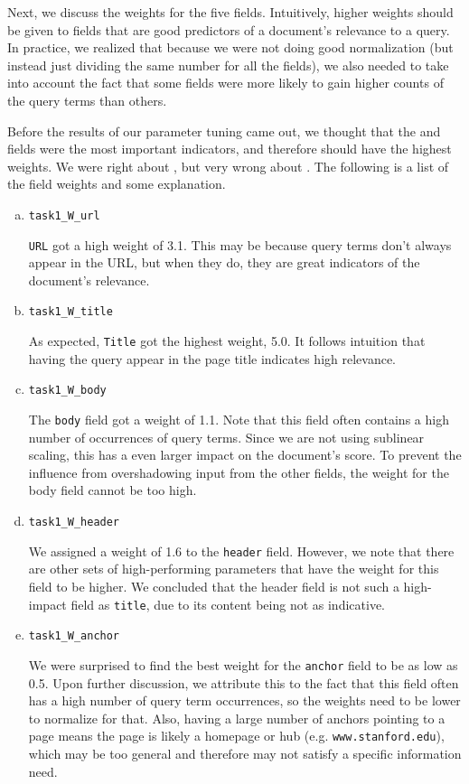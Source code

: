 \documentclass[10pt,twocolumn]{article}
\begin{document}
Next, we discuss the weights for the five fields. Intuitively, higher weights should be given to fields that are good predictors of a document's relevance to a query. In practice, we realized that because we were not doing good normalization (but instead just dividing the same number for all the fields), we also needed to take into account the fact that some fields were more likely to gain higher counts of the query terms than others.

Before the results of our parameter tuning came out, we thought that the  and  fields were the most important indicators, and therefore should have the highest weights. We were right about , but very wrong about . The following is a list of the field weights and some explanation.
\begin{enumerate}[(a)]
\item \texttt{task1\_W\_url}

\texttt{URL} got a high weight of 3.1. This may be because query terms don't always appear in the URL, but when they do, they are great indicators of the document's relevance.
\item \texttt{task1\_W\_title}

As expected, \texttt{Title} got the highest weight, 5.0. It follows intuition that having the query appear in the page title indicates high relevance. 
\item \texttt{task1\_W\_body}

The \texttt{body} field got a weight of 1.1. Note that this field often contains a high number of occurrences of query terms. Since we are not using sublinear scaling, this has a even larger impact on the document's score. To prevent the influence from overshadowing input from the other fields, the weight for the body field cannot be too high.
\item \texttt{task1\_W\_header}

We assigned a weight of 1.6 to the \texttt{header} field. However, we note that there are other sets of high-performing parameters that have the weight for this field to be higher. We concluded that the header field is not such a high-impact field as \texttt{title}, due to its content being not as indicative.
\item \texttt{task1\_W\_anchor}

We were surprised to find the best weight for the \texttt{anchor} field to be as low as 0.5. Upon further discussion, we attribute this to the fact that this field often has a high number of query term occurrences, so the weights need to be lower to normalize for that. Also, having a large number of anchors pointing to a page means the page is likely a homepage or hub (e.g. \texttt{www.stanford.edu}), which may be too general and therefore may not satisfy a specific information need.
\end{enumerate}
\end{document}
